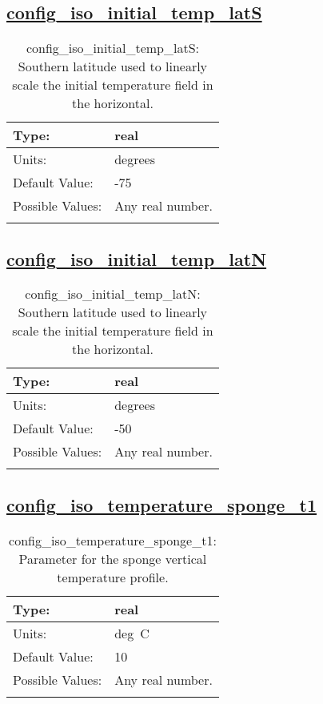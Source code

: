 \subsection[config\_iso\_initial\_temp\_latS]{\hyperref[sec:nm_tab_iso]{config\_iso\_initial\_temp\_latS}}
\label{subsec:nm_sec_config_iso_initial_temp_latS}
\begin{center}
\begin{longtable}{| p{2.0in} || p{4.0in} |}
    \hline
    Type: & real \\
    \hline
    Units: & \si{degrees} \\
    \hline
    Default Value: & -75 \\
    \hline
    Possible Values: & Any real number. \\
    \hline
    \caption{config\_iso\_initial\_temp\_latS: Southern latitude used to linearly scale the initial temperature field in the horizontal.}
\end{longtable}
\end{center}
\subsection[config\_iso\_initial\_temp\_latN]{\hyperref[sec:nm_tab_iso]{config\_iso\_initial\_temp\_latN}}
\label{subsec:nm_sec_config_iso_initial_temp_latN}
\begin{center}
\begin{longtable}{| p{2.0in} || p{4.0in} |}
    \hline
    Type: & real \\
    \hline
    Units: & \si{degrees} \\
    \hline
    Default Value: & -50 \\
    \hline
    Possible Values: & Any real number. \\
    \hline
    \caption{config\_iso\_initial\_temp\_latN: Southern latitude used to linearly scale the initial temperature field in the horizontal.}
\end{longtable}
\end{center}
\subsection[config\_iso\_temperature\_sponge\_t1]{\hyperref[sec:nm_tab_iso]{config\_iso\_temperature\_sponge\_t1}}
\label{subsec:nm_sec_config_iso_temperature_sponge_t1}
\begin{center}
\begin{longtable}{| p{2.0in} || p{4.0in} |}
    \hline
    Type: & real \\
    \hline
    Units: & \si{deg.C} \\
    \hline
    Default Value: & 10 \\
    \hline
    Possible Values: & Any real number. \\
    \hline
    \caption{config\_iso\_temperature\_sponge\_t1: Parameter for the sponge vertical temperature profile.}
\end{longtable}
\end{center}
